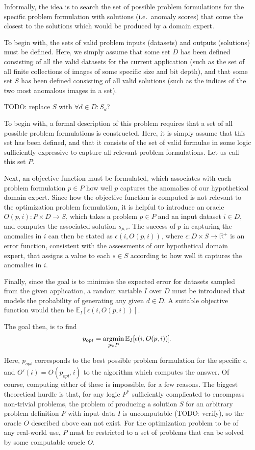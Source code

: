 Informally, the idea is to search the set of possible problem formulations for the specific problem formulation with solutions (i.e.\ anomaly scores) that come the closest to the solutions which would be produced by a domain expert.

To begin with, the sets of valid problem inputs (datasets) and outputs (solutions) must be defined. Here, we simply assume that some set $D$ has been defined consisting of all the valid datasets for the current application (such as the set of all finite collections of images of some specific size and bit depth), and that some set $S$ has been defined consisting of all valid solutions (such as the indices of the two most anomalous images in a set).

TODO: replace $S$ with $\forall d \in D: S_d$?

To begin with, a formal description of this problem requires that a set of all possible problem formulations is constructed. Here, it is simply assume that this set has been defined, and that it consists of the set of valid formulae in some logic sufficiently expressive to capture all relevant problem formulations. Let us call this set $P$.

Next, an objective function must be formulated, which associates with each problem formulation $p \in P$ how well $p$ captures the anomalies of our hypothetical domain expert. Since how the objective function is computed is not relevant to the optimization problem formulation, it is helpful to introduce an oracle $O(p, i): P \times D \rightarrow S$, which takes a problem $p \in P$ and an input dataset $i \in D$, and computes the associated solution $s_{p,i}$. The success of $p$ in capturing the anomalies in $i$ can then be stated as $\epsilon(i, O(p, i))$, where $\epsilon: D \times S \rightarrow \mathbb{R}^+$ is an error function, consistent with the assessments of our hypothetical domain expert, that assigns a value to each $s \in S$ according to how well it captures the anomalies in $i$.

Finally, since the goal is to minimise the expected error for datasets sampled from the given application, a random variable $I$ over $D$ must be introduced that models the probability of generating any given $d \in D$. A suitable objective function would then be $\mathbb{E}_I [\epsilon(i, O(p, i))]$.

The goal then, is to find 
\[
    p_{opt} = \argmin_{p \in P}\mathbb{E}_I [ \epsilon(i, O(p, i)) ].
\]

Here, $p_{opt}$ corresponds to the best possible problem formulation for the specific $\epsilon$, and $O'(i) = O(p_{opt}, i)$ to the algorithm which computes the answer. Of course, computing either of these is impossible, for a few reasons. The biggest theoretical hurdle is that, for any logic $P^*$ sufficiently complicated to encompass non-trivial problems, the problem of producing a solution $S$ for an arbitrary problem definition $P$ with input data $I$ is uncomputable (TODO: verify), so the oracle $O$ described above can not exist. For the optimization problem to be of any real-world use, $P$ must be restricted to a set of problems that can be solved by some computable oracle $O$.

